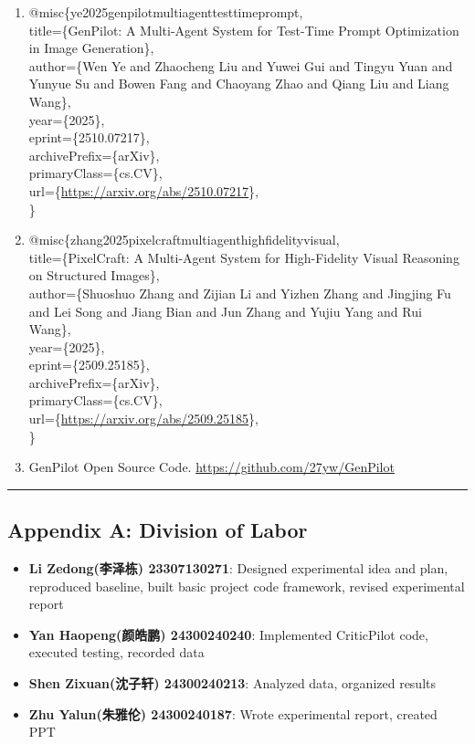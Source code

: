 \documentclass[
]{article}
\begin{document}
\begin{enumerate}
\def\labelenumi{\arabic{enumi}.}
\item
  @misc\{ye2025genpilotmultiagenttesttimeprompt,\\
  title=\{GenPilot: A Multi-Agent System for Test-Time Prompt
  Optimization in Image Generation\}, \\
  author=\{Wen Ye and Zhaocheng Liu and Yuwei Gui and Tingyu Yuan and
  Yunyue Su and Bowen Fang and Chaoyang Zhao and Qiang Liu and Liang
  Wang\},\\
  year=\{2025\},\\
  eprint=\{2510.07217\},\\
  archivePrefix=\{arXiv\},\\
  primaryClass=\{cs.CV\},\\
  url=\{\url{https://arxiv.org/abs/2510.07217}\}, \\
  \}
\item
  @misc\{zhang2025pixelcraftmultiagenthighfidelityvisual,\\
  title=\{PixelCraft: A Multi-Agent System for High-Fidelity Visual
  Reasoning on Structured Images\}, \\
  author=\{Shuoshuo Zhang and Zijian Li and Yizhen Zhang and Jingjing Fu
  and Lei Song and Jiang Bian and Jun Zhang and Yujiu Yang and Rui
  Wang\},\\
  year=\{2025\},\\
  eprint=\{2509.25185\},\\
  archivePrefix=\{arXiv\},\\
  primaryClass=\{cs.CV\},\\
  url=\{\url{https://arxiv.org/abs/2509.25185}\}, \\
  \}
\item
  GenPilot Open Source Code. \url{https://github.com/27yw/GenPilot}
\end{enumerate}

\begin{center}\rule{0.5\linewidth}{0.5pt}\end{center}

\subsection{Appendix A: Division of
Labor}\label{appendix-a-division-of-labor}

\begin{itemize}
\item
  \textbf{Li Zedong(李泽栋) 23307130271}: Designed experimental idea and
  plan, reproduced baseline, built basic project code framework, revised
  experimental report
\item
  \textbf{Yan Haopeng(颜皓鹏) 24300240240}: Implemented CriticPilot
  code, executed testing, recorded data
\item
  \textbf{Shen Zixuan(沈子轩) 24300240213}: Analyzed data, organized
  results
\item
  \textbf{Zhu Yalun(朱雅伦) 24300240187}: Wrote experimental report,
  created PPT
\end{itemize}
\end{document}
